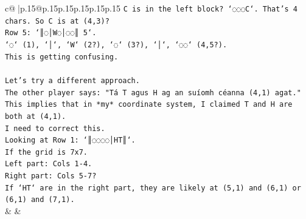 \documentclass{article}
\begin{document}
{\begin{supertabular}{c@{$\;$}|p{.15\linewidth}@{}p{.15\linewidth}p{.15\linewidth}p{.15\linewidth}p{.15\linewidth}p{.15\linewidth}}
{{{\texttt{C is in the left block? `◌◌◌C`. That's 4 chars. So C is at (4,3)?} \\
\texttt{Row 5: `║◌│W◌│◌◌║ 5`.} \\
\texttt{`◌` (1), `│`, `W` (2?), `◌` (3?), `│`, `◌◌` (4,5?).} \\
\texttt{This is getting confusing.} \\
\\ 
\texttt{Let's try a different approach.} \\
\texttt{The other player says: "Tá T agus H ag an suíomh céanna (4,1) agat."} \\
\texttt{This implies that in *my* coordinate system, I claimed T and H are both at (4,1).} \\
\texttt{I need to correct this.} \\
\texttt{Looking at Row 1: `║◌◌◌◌│HT║`.} \\
\texttt{If the grid is 7x7.} \\
\texttt{Left part: Cols 1{-}4.} \\
\texttt{Right part: Cols 5{-}7?} \\
\texttt{If `HT` are in the right part, they are likely at (5,1) and (6,1) or (6,1) and (7,1).} \\
            }
        }
    }
    & & \\ \\


\end{supertabular}}
\end{document}

